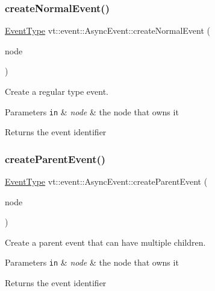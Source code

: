 \subsubsection{\texorpdfstring{create\+Normal\+Event()}{createNormalEvent()}}
{\footnotesize\ttfamily \hyperlink{namespacevt_a009267401def7ae8bf201892222d060f}{Event\+Type} vt\+::event\+::\+Async\+Event\+::create\+Normal\+Event (\begin{DoxyParamCaption}\item[{\hyperlink{namespacevt_a866da9d0efc19c0a1ce79e9e492f47e2}{Node\+Type} const \&}]{node }\end{DoxyParamCaption})}



Create a regular type event. 


\begin{DoxyParams}[1]{Parameters}
\mbox{\tt in}  & {\em node} & the node that owns it\\
\hline
\end{DoxyParams}
\begin{DoxyReturn}{Returns}
the event identifier 
\end{DoxyReturn}
\mbox{\label{structvt_1_1event_1_1_async_event_a9646f211d660d2e991df07b77e5f2cc6}} 
\subsubsection{\texorpdfstring{create\+Parent\+Event()}{createParentEvent()}}
{\footnotesize\ttfamily \hyperlink{namespacevt_a009267401def7ae8bf201892222d060f}{Event\+Type} vt\+::event\+::\+Async\+Event\+::create\+Parent\+Event (\begin{DoxyParamCaption}\item[{\hyperlink{namespacevt_a866da9d0efc19c0a1ce79e9e492f47e2}{Node\+Type} const \&}]{node }\end{DoxyParamCaption})}



Create a parent event that can have multiple children. 


\begin{DoxyParams}[1]{Parameters}
\mbox{\tt in}  & {\em node} & the node that owns it\\
\hline
\end{DoxyParams}
\begin{DoxyReturn}{Returns}
the event identifier 
\end{DoxyReturn}
\mbox{\label{structvt_1_1event_1_1_async_event_a2228d79f1c1f838e630dcb3325edfde3}} 
